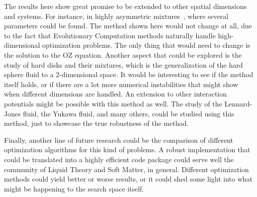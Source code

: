 The results here show great promise to be extended to other spatial dimensions and systems. 
For instance, in highly asymmetric mixtures~\cite{zhouLocalStructureThermodynamics2019}, 
where several parameters could be found. The method shown here would not change at all, due 
to the fact that Evolutionary Computation methods naturally handle high-dimensional 
optimization problems. The only thing that would need to change is the solution to the OZ 
equation. Another aspect that could be explored is the study of hard disks and their 
mixtures, which is the generalization of the hard sphere fluid to a \(2\)-dimensional 
space. It would be interesting to see if the method itself holds, or if there are a lot 
more numerical instabilities that might show when different dimensions are handled.
An extension to other interaction potentials might be possible with this method as well. 
The study of the Lennard-Jones fluid, the Yukawa fluid, and many others, could be studied 
using this method, just to showcase the true robustness of the method.

Finally, another line of future research could be the comparison of different optimization 
algorithms for this kind of problems. A robust implementation that could be translated into 
a highly efficient code package could serve well the community of Liquid Theory and Soft 
Matter, in general. Different optimization methods could yield better or worse results, or 
it could shed some light into what might be happening to the search space itself.